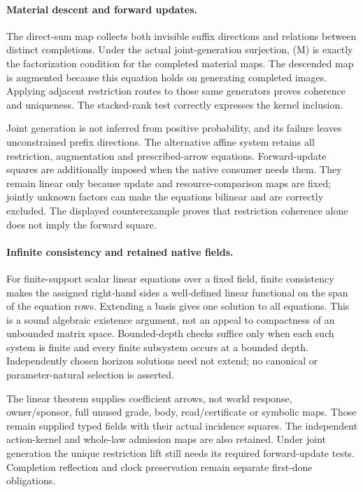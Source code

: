 \documentclass{article}
\begin{document}
\paragraph{Material descent and forward updates.}
The direct-sum map collects both invisible suffix directions and relations between distinct completions. Under the actual joint-generation surjection, (M) is exactly the factorization condition for the completed material maps. The descended map is augmented because this equation holds on generating completed images. Applying adjacent restriction routes to those same generators proves coherence and uniqueness. The stacked-rank test correctly expresses the kernel inclusion.

Joint generation is not inferred from positive probability, and its failure leaves unconstrained prefix directions. The alternative affine system retains all restriction, augmentation and prescribed-arrow equations. Forward-update squares are additionally imposed when the native consumer needs them. They remain linear only because update and resource-comparison maps are fixed; jointly unknown factors can make the equations bilinear and are correctly excluded. The displayed counterexample proves that restriction coherence alone does not imply the forward square.

\paragraph{Infinite consistency and retained native fields.}
For finite-support scalar linear equations over a fixed field, finite consistency makes the assigned right-hand sides a well-defined linear functional on the span of the equation rows. Extending a basis gives one solution to all equations. This is a sound algebraic existence argument, not an appeal to compactness of an unbounded matrix space. Bounded-depth checks suffice only when each such system is finite and every finite subsystem occurs at a bounded depth. Independently chosen horizon solutions need not extend; no canonical or parameter-natural selection is asserted.

The linear theorem supplies coefficient arrows, not world response, owner/sponsor, full unused grade, body, read/certificate or symbolic maps. Those remain supplied typed fields with their actual incidence squares. The independent action-kernel and whole-law admission maps are also retained. Under joint generation the unique restriction lift still needs its required forward-update tests. Completion reflection and clock preservation remain separate first-done obligations.
\end{document}
